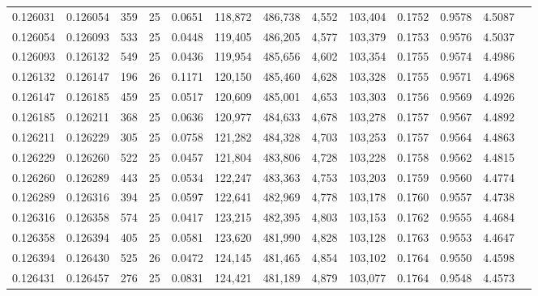 \begin{tabular}{rrrrrrrrrrrrr}
0.126031 & 0.126054 &   359 &  25 &                                     0.0651 & 118,872 & 486,738 &   4,552 & 103,404 & 0.1752 & 0.9578 & 4.5087 \\
0.126054 & 0.126093 &   533 &  25 &                                     0.0448 & 119,405 & 486,205 &   4,577 & 103,379 & 0.1753 & 0.9576 & 4.5037 \\
0.126093 & 0.126132 &   549 &  25 &                                     0.0436 & 119,954 & 485,656 &   4,602 & 103,354 & 0.1755 & 0.9574 & 4.4986 \\
0.126132 & 0.126147 &   196 &  26 &                                     0.1171 & 120,150 & 485,460 &   4,628 & 103,328 & 0.1755 & 0.9571 & 4.4968 \\
0.126147 & 0.126185 &   459 &  25 &                                     0.0517 & 120,609 & 485,001 &   4,653 & 103,303 & 0.1756 & 0.9569 & 4.4926 \\
0.126185 & 0.126211 &   368 &  25 &                                     0.0636 & 120,977 & 484,633 &   4,678 & 103,278 & 0.1757 & 0.9567 & 4.4892 \\
0.126211 & 0.126229 &   305 &  25 &                                     0.0758 & 121,282 & 484,328 &   4,703 & 103,253 & 0.1757 & 0.9564 & 4.4863 \\
0.126229 & 0.126260 &   522 &  25 &                                     0.0457 & 121,804 & 483,806 &   4,728 & 103,228 & 0.1758 & 0.9562 & 4.4815 \\
0.126260 & 0.126289 &   443 &  25 &                                     0.0534 & 122,247 & 483,363 &   4,753 & 103,203 & 0.1759 & 0.9560 & 4.4774 \\
0.126289 & 0.126316 &   394 &  25 &                                     0.0597 & 122,641 & 482,969 &   4,778 & 103,178 & 0.1760 & 0.9557 & 4.4738 \\
0.126316 & 0.126358 &   574 &  25 &                                     0.0417 & 123,215 & 482,395 &   4,803 & 103,153 & 0.1762 & 0.9555 & 4.4684 \\
0.126358 & 0.126394 &   405 &  25 &                                     0.0581 & 123,620 & 481,990 &   4,828 & 103,128 & 0.1763 & 0.9553 & 4.4647 \\
0.126394 & 0.126430 &   525 &  26 &                                     0.0472 & 124,145 & 481,465 &   4,854 & 103,102 & 0.1764 & 0.9550 & 4.4598 \\
0.126431 & 0.126457 &   276 &  25 &                                     0.0831 & 124,421 & 481,189 &   4,879 & 103,077 & 0.1764 & 0.9548 & 4.4573 \\

\end{tabular}
